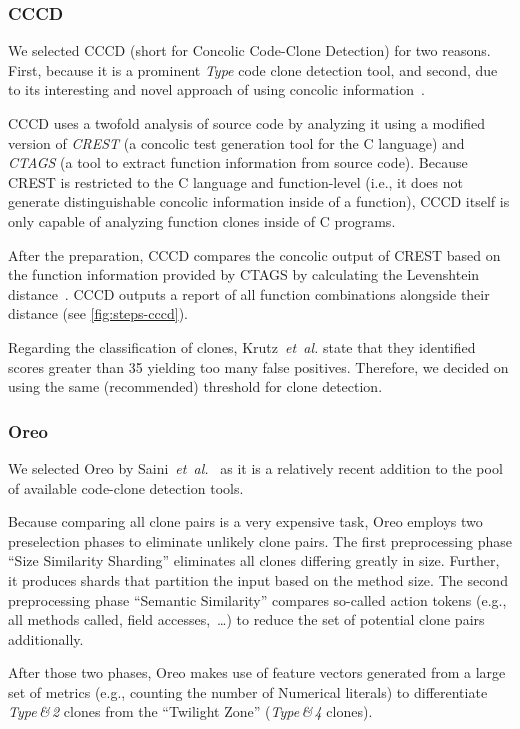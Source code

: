 \documentclass[10pt,journal,compsoc]{IEEEtran}
\def\T#1{\textsl{Type\nobreakdash-#1}}
\begin{document}
\subsubsection{CCCD}
\label{expl:cccd}We selected CCCD (short for Concolic Code-Clone Detection) for two reasons. First, because it is a prominent \T4 code clone detection tool, and second, due to its interesting and novel approach of using concolic information~\cite{krutz2013code}.

CCCD uses a twofold analysis of source code by analyzing it using a modified version of \textsl{CREST} (a concolic test generation tool for the C language) and \textsl{CTAGS} (a tool to extract function information from source code).
Because CREST is restricted to the C language and function-level (i.e., it does not generate distinguishable concolic information inside of a function), CCCD itself is only capable of analyzing function clones inside of C programs.

After the preparation, CCCD compares the concolic output of CREST based on the function information provided by CTAGS by calculating the Levenshtein distance~\cite{levenshtein1966binary,al2021towards}. CCCD outputs a report of all function combinations alongside their distance (see \cref{fig:steps-cccd}).

Regarding the classification of clones, Krutz~\textsl{et~al.} state that they identified scores greater than 35 yielding too many false positives. Therefore, we decided on using the same (recommended) threshold for clone detection.

\subsubsection{Oreo}\label{sec:oreoX}
We selected Oreo by Saini~\textsl{et~al.}~\cite{saini2018oreo} as it is a relatively recent addition to the pool of available code-clone detection tools.

Because comparing all clone pairs is a very expensive task, Oreo employs two preselection phases to eliminate unlikely clone pairs. The first preprocessing phase \enquote{Size Similarity Sharding} eliminates all clones differing greatly in size. Further, it produces shards that partition the input based on the method size.
The second preprocessing phase \enquote{Semantic Similarity} compares so-called action tokens (e.g., all methods called, field accesses,~\ldots) to reduce the set of potential clone pairs additionally.

After those two phases, Oreo makes use of feature vectors generated from a large set of metrics (e.g., counting the number of Numerical literals) to differentiate \T{1\,\&\,2} clones from the \enquote{Twilight Zone} (\T{3\,\&\,4} clones).
\end{document}
